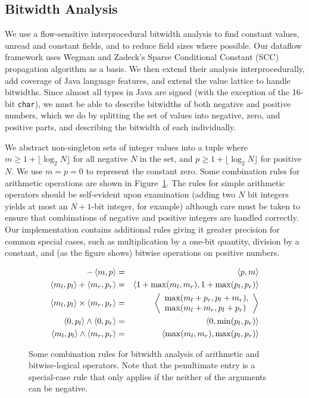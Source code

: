 \documentclass{sig-alt-full}
\begin{document}
\subsection{Bitwidth Analysis}
We use a flow-sensitive interprocedural bitwidth analysis to
find constant values, unread and constant fields, and to reduce
field sizes where possible.  Our dataflow framework uses
Wegman and Zadeck's Sparse Conditional Constant (SCC) propagation
algorithm \cite{wegman91:scc} as a basis.  We then extend their
analysis interprocedurally, add coverage of Java language features,
and extend the value lattice to handle bitwidths.
Since almost all types in Java are signed (with the exception of the
16-bit {\tt char}), we must be able to describe bitwidths of both
negative and positive numbers, which we do by splitting the set of
values into negative, zero, and positive parts, and describing the
bitwidth of each individually.

We abstract non-singleton sets of integer values into a tuple
 where $m\ge 1+\lfloor\log_2 N\rfloor$ for all negative $N$
in the set, and $p\ge 1+\lfloor\log_2 N\rfloor$ for positive $N$.  We
use $m=p=0$ to represent the constant zero.
Some combination rules for arithmetic operations are
shown in Figure~\ref{fig:bitrules}.  The rules for simple arithmetic
operators should be self-evident upon examination (adding two $N$ bit
integers yields at most an $N+1$-bit integer, for example) although
care must be taken to ensure that combinations of negative and
positive integers are handled correctly.  Our implementation contains
additional rules giving it greater precision for common special cases,
such as multiplication by
a one-bit quantity, division by a constant, and (as the figure shows)
bitwise operations on positive numbers.

\begin{figure}[tp]
\begin{eqnarray*}
-\left\langle m,p \right\rangle &=& \left\langle p,m \right\rangle\\
\left\langle m_l,p_l \right\rangle + \left\langle m_r,p_r \right\rangle &=& \left\langle 1+\max(m_l,m_r),1+\max(p_l,p_r) \right\rangle\\
\left\langle m_l,p_l \right\rangle \times \left\langle m_r,p_r \right\rangle &=&
\left\langle \begin{array}{l}\max(m_l+p_r,p_l+m_r),\\
                       \max(m_l+m_r,p_l+p_r)\end{array} \right\rangle\\
\left\langle 0,p_l \right\rangle \wedge \left\langle 0,p_r \right\rangle &=& \left\langle 0,\min(p_l,p_r) \right\rangle\\
\left\langle m_l,p_l \right\rangle\wedge \left\langle m_r,p_r \right\rangle &=& \left\langle \max(m_l,m_r),\max(p_l,p_r) \right\rangle
\end{eqnarray*}%
\caption{Some combination rules for bitwidth analysis of arithmetic
  and bitwise-logical operators.
  Note that the penultimate entry is a
  special-case rule that only applies if the neither of the
  arguments can be negative.
}\label{fig:bitrules}
\end{figure}
\end{document}
